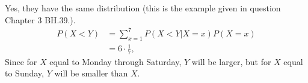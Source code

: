 
\setcounter{theorem}{41}
\begin{exercise}[BH.3.42]
\begin{solution}
	Yes, they have the same distribution (this is the example given in question Chapter 3 BH.39.). 
    \begin{align*}
    	P(X<Y) &= \sum_{x = 1}^{7}P(X<Y|X=x)P(X=x)\\
    	& = 6\cdot\frac{1}{7},
    \end{align*}
    Since for $X$ equal to Monday through Saturday, $Y$ will be larger, but for $X$ equal to Sunday, $Y$ will be smaller than $X$.
\end{solution}
\end{exercise}


